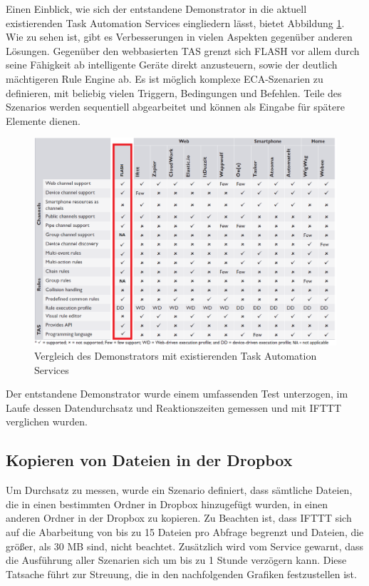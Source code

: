 Einen Einblick, wie sich der entstandene Demonstrator in die aktuell existierenden Task Automation Services eingliedern lässt, bietet Abbildung \ref{fig:eval0}. Wie zu sehen ist, gibt es Verbesserungen in vielen Aspekten gegenüber anderen Lösungen. Gegenüber den webbasierten TAS grenzt sich FLASH vor allem durch seine Fähigkeit ab intelligente Geräte direkt anzusteuern, sowie der deutlich mächtigeren Rule Engine ab. Es ist möglich komplexe ECA-Szenarien zu definieren, mit beliebig vielen Triggern, Bedingungen und Befehlen. Teile des Szenarios werden sequentiell abgearbeitet und können als Eingabe für spätere Elemente dienen.\\

\begin{figure}
	\centering
	\includegraphics[width=\textwidth]{bilder/TASOverview_eval}
	\caption{Vergleich des Demonstrators mit existierenden Task Automation Services}
	\label{fig:eval0}
\end{figure}


Der entstandene Demonstrator wurde einem umfassenden Test unterzogen, im Laufe dessen Datendurchsatz und Reaktionszeiten gemessen und mit IFTTT verglichen wurden. 

\subsection{Kopieren von Dateien in der Dropbox}
Um Durchsatz zu messen, wurde ein Szenario definiert, dass sämtliche Dateien, die in einen bestimmten Ordner in Dropbox hinzugefügt wurden, in einen anderen Ordner in der Dropbox zu kopieren. Zu Beachten ist, dass IFTTT sich auf die Abarbeitung von bis zu 15 Dateien pro Abfrage begrenzt und Dateien, die größer, als 30 MB sind, nicht beachtet. Zusätzlich wird vom Service gewarnt, dass die Ausführung aller Szenarien sich um bis zu 1 Stunde verzögern kann. Diese Tatsache führt zur Streuung, die in den nachfolgenden Grafiken festzustellen ist.

